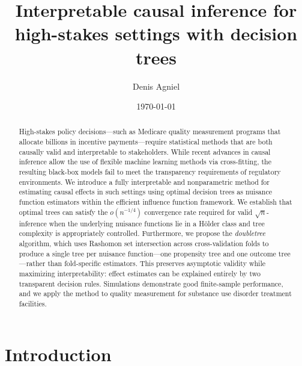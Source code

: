 \documentclass[12pt]{article}
\title{Interpretable causal inference for high-stakes settings with decision trees}
\author{Denis Agniel}
\date{\today}
\begin{document}
\maketitle
\begin{abstract}
    High-stakes policy decisions---such as Medicare quality measurement programs that allocate billions in incentive payments---require statistical methods that are both causally valid and interpretable to stakeholders. While recent advances in causal inference allow the use of flexible machine learning methods via cross-fitting, the resulting black-box models fail to meet the transparency requirements of regulatory environments. We introduce a fully interpretable and nonparametric method for estimating causal effects in such settings using optimal decision trees as nuisance function estimators within the efficient influence function framework. We establish that optimal trees can satisfy the $o(n^{-1/4})$ convergence rate required for valid $\sqrt{n}$-inference when the underlying nuisance functions lie in a H\"older class and tree complexity is appropriately controlled. Furthermore, we propose the \textit{doubletree} algorithm, which uses Rashomon set intersection across cross-validation folds to produce a single tree per nuisance function---one propensity tree and one outcome tree---rather than fold-specific estimators. This preserves asymptotic validity while maximizing interpretability: effect estimates can be explained entirely by two transparent decision rules. Simulations demonstrate good finite-sample performance, and we apply the method to quality measurement for substance use disorder treatment facilities.
\end{abstract}

\section{Introduction}
\end{document}
